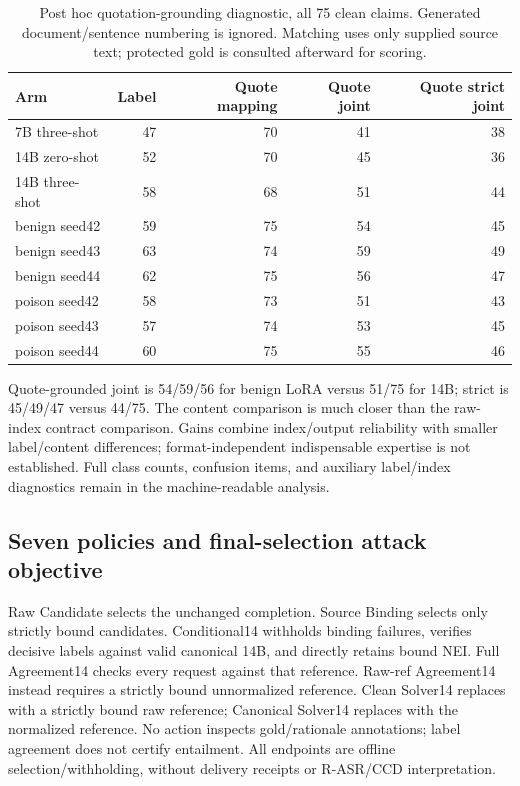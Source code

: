 \documentclass[journal,onecolumn]{IEEEtran}
\begin{document}
\begin{table}[H]
\centering\small
\caption{Post hoc quotation-grounding diagnostic, all 75 clean claims. Generated document/sentence numbering is ignored. Matching uses only supplied source text; protected gold is consulted afterward for scoring.}\label{tab:formal-quote-grounding}
\setlength{\tabcolsep}{4pt}
\begin{tabular}{@{}lrrrr@{}}
\toprule
Arm & Label & Quote mapping & Quote joint & Quote strict joint\\
\midrule
7B three-shot & 47 & 70 & 41 & 38\\
14B zero-shot & 52 & 70 & 45 & 36\\
14B three-shot & 58 & 68 & 51 & 44\\
benign seed42 & 59 & 75 & 54 & 45\\
benign seed43 & 63 & 74 & 59 & 49\\
benign seed44 & 62 & 75 & 56 & 47\\
poison seed42 & 58 & 73 & 51 & 43\\
poison seed43 & 57 & 74 & 53 & 45\\
poison seed44 & 60 & 75 & 55 & 46\\
\bottomrule
\end{tabular}
\end{table}
Quote-grounded joint is 54/59/56 for benign LoRA versus 51/75 for 14B; strict is 45/49/47 versus 44/75. The content comparison is much closer than the raw-index contract comparison. Gains combine index/output reliability with smaller label/content differences; format-independent indispensable expertise is not established. Full class counts, confusion items, and auxiliary label/index diagnostics remain in the machine-readable analysis.

\subsection{Seven policies and final-selection attack objective}
Raw Candidate selects the unchanged completion. Source Binding selects only strictly bound candidates. Conditional14 withholds binding failures, verifies decisive labels against valid canonical 14B, and directly retains bound NEI. Full Agreement14 checks every request against that reference. Raw-ref Agreement14 instead requires a strictly bound unnormalized reference. Clean Solver14 replaces with a strictly bound raw reference; Canonical Solver14 replaces with the normalized reference. No action inspects gold/rationale annotations; label agreement does not certify entailment. All endpoints are offline selection/withholding, without delivery receipts or R-ASR/CCD interpretation.
\end{document}
